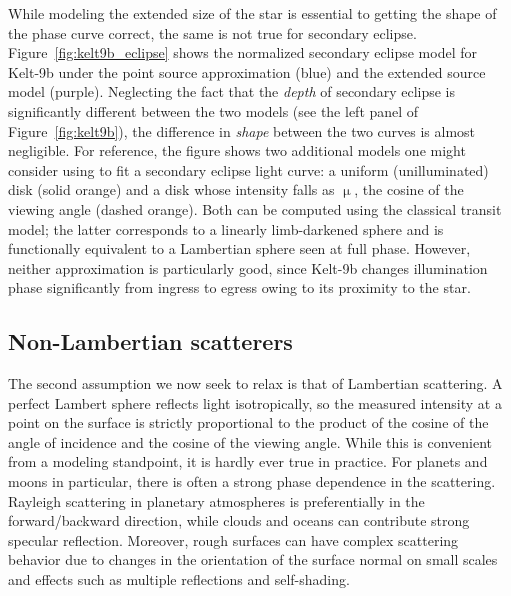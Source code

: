 \documentclass[modern]{aastex62}
\begin{document}
While modeling the extended size of the star is essential to
getting the shape of the phase curve correct, the same is not true
for secondary eclipse. Figure~\ref{fig:kelt9b_eclipse} shows
the normalized secondary eclipse model for Kelt-9b under the point
source approximation (blue) and the extended source model (purple).
Neglecting the fact that the \emph{depth} of secondary eclipse is
significantly different between the two models (see the left panel
of Figure~\ref{fig:kelt9b}), the difference in \emph{shape} between
the two curves is almost negligible.
%
For reference, the figure shows
two additional models one might consider using to fit a secondary
eclipse light curve: a uniform (unilluminated) disk (solid orange)
and a disk whose intensity falls as $\upmu$, the cosine of the
viewing angle (dashed orange). Both can be computed using the
classical \citet{MandelAgol2002} transit model; the latter corresponds
to a linearly limb-darkened sphere and is functionally equivalent to
a Lambertian sphere seen at full phase.
However, neither approximation is particularly good, since Kelt-9b
changes illumination phase significantly from ingress to egress
owing to its proximity to the star.

\subsection{Non-Lambertian scatterers}
\label{sec:nonlambertian}

The second assumption we now seek to relax is that of Lambertian
scattering. A perfect Lambert sphere reflects light isotropically, so
the measured intensity at a point on the surface is strictly
proportional to the product of the cosine of the angle of incidence
and the cosine of the viewing angle. While this is convenient
from a modeling standpoint, it is hardly ever true in practice.
For planets and moons in particular, there is often a strong phase
dependence in the scattering. Rayleigh scattering in planetary
atmospheres is preferentially in the forward/backward direction,
while clouds and oceans can contribute strong specular reflection.
Moreover, rough surfaces can have complex scattering behavior due
to changes in the orientation of the surface normal on small scales
and effects such as multiple reflections and self-shading.
\end{document}
